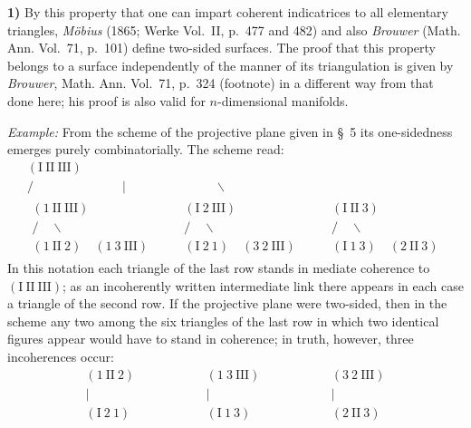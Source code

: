\documentclass{article}
\begin{document}
\textbf{1)} By this property that one can impart coherent indicatrices to all elementary triangles, \emph{Möbius} (1865; Werke Vol.~II, p.~477 and 482) and also \emph{Brouwer} (Math. Ann. Vol.~71, p.~101) define two-sided surfaces. The proof that this property belongs to a surface independently of the manner of its triangulation is given by \emph{Brouwer}, Math. Ann. Vol.~71, p.~324 (footnote) in a different way from that done here; his proof is also valid for $n$-dimensional manifolds.

\emph{Example:} From the scheme of the projective plane given in §~5 its one-sidedness emerges purely combinatorially. The scheme read:
\[
\begin{gathered}
(\mathrm{I}\ \mathrm{II}\ \mathrm{III}) \\
/\qquad\qquad\qquad\quad |\quad\qquad\qquad\qquad \backslash \\
\begin{matrix}
(1\ \mathrm{II}\ \mathrm{III}) \\
/\quad\backslash \\
(1\ \mathrm{II}\ 2) \quad (1\ 3\ \mathrm{III})
\end{matrix}
\qquad
\begin{matrix}
(\mathrm{I}\ 2\ \mathrm{III}) \\
/\quad\backslash \\
(\mathrm{I}\ 2\ 1) \quad (3\ 2\ \mathrm{III})
\end{matrix}
\qquad
\begin{matrix}
(\mathrm{I}\ \mathrm{II}\ 3) \\
/\quad\backslash \\
(\mathrm{I}\ 1\ 3) \quad (2\ \mathrm{II}\ 3)
\end{matrix}
\end{gathered}
\]
In this notation each triangle of the last row stands in mediate coherence to $(\mathrm{I}\ \mathrm{II}\ \mathrm{III})$; as an incoherently written intermediate link there appears in each case a triangle of the second row. If the projective plane were two-sided, then in the scheme any two among the six triangles of the last row in which two identical figures appear would have to stand in coherence; in truth, however, three incoherences occur:
\[
\begin{array}{ccccc}
(1\ \mathrm{II}\ 2) & \qquad\qquad & (1\ 3\ \mathrm{III}) & \qquad\qquad & (3\ 2\ \mathrm{III}) \\
| & & | & & | \\
(\mathrm{I}\ 2\ 1) & & (\mathrm{I}\ 1\ 3) & & (2\ \mathrm{II}\ 3)
\end{array}
\]
\end{document}
